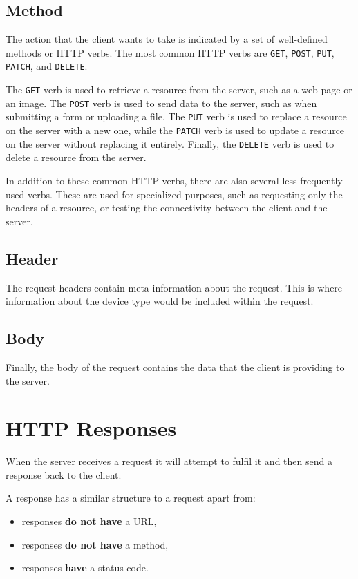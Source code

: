 \documentclass[
  letterpaper,
  DIV=11,
  numbers=noendperiod]{scrreprt}
\providecommand{\tightlist}{%
  \setlength{\itemsep}{0pt}\setlength{\parskip}{0pt}}\usepackage{longtable,booktabs,array}
\begin{document}
\subsection{Method}\label{method}

The action that the client wants to take is indicated by a set of
well-defined methods or HTTP verbs. The most common HTTP verbs are
\texttt{GET}, \texttt{POST}, \texttt{PUT}, \texttt{PATCH}, and
\texttt{DELETE}.

The \texttt{GET} verb is used to retrieve a resource from the server,
such as a web page or an image. The \texttt{POST} verb is used to send
data to the server, such as when submitting a form or uploading a file.
The \texttt{PUT} verb is used to replace a resource on the server with a
new one, while the \texttt{PATCH} verb is used to update a resource on
the server without replacing it entirely. Finally, the \texttt{DELETE}
verb is used to delete a resource from the server.

In addition to these common HTTP verbs, there are also several less
frequently used verbs. These are used for specialized purposes, such as
requesting only the headers of a resource, or testing the connectivity
between the client and the server.

\subsection{Header}\label{header}

The request headers contain meta-information about the request. This is
where information about the device type would be included within the
request.

\subsection{Body}\label{body}

Finally, the body of the request contains the data that the client is
providing to the server.

\section{HTTP Responses}\label{http-responses}

When the server receives a request it will attempt to fulfil it and then
send a response back to the client.

A response has a similar structure to a request apart from:

\begin{itemize}
\tightlist
\item
  responses \textbf{do not have} a URL,
\item
  responses \textbf{do not have} a method,
\item
  responses \textbf{have} a status code.
\end{itemize}
\end{document}

